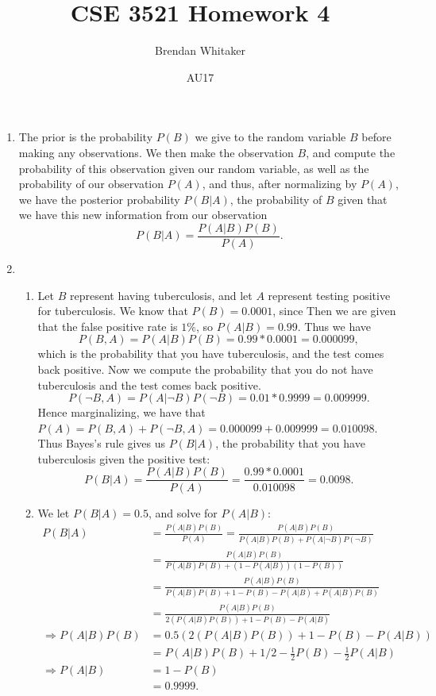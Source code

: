 \documentclass[10pt,oneside,reqno]{amsart}
\theoremstyle{plain}
\theoremstyle{definition}
\begin{document}
\title{CSE 3521 Homework 4}

\date{AU17}

\author[Brendan Whitaker]{Brendan Whitaker}

\maketitle

\begin{enumerate}[label=\arabic*.]

\item The prior is the probability $P(B)$ we give to the random variable $B$ before making any observations. We then make the observation $B$, and compute the probability of this observation given our random variable, as well as the probability of our observation $P(A)$, and thus, after normalizing by $P(A)$, we have the posterior probability $P(B|A)$, the probability of $B$ given that we have this new information from our observation
\[P(B|A) = \frac{P(A|B)P(B)}{P(A)}. \] 

\item 

\begin{enumerate}

\item Let $B$ represent having tuberculosis, and let $A$ represent testing positive for tuberculosis. We know that $P(B) = 0.0001$, since Then we are given that the false positive rate is $1\%$, so $P(A|B) = 0.99$. Thus we have
\[P(B,A) = P(A|B)P(B)= 0.99*0.0001 = 0.000099, \]
which is the probability that you have tuberculosis, and the test comes back positive. Now we compute the probability that you do not have tuberculosis and the test comes back positive. 
\[P(\neg B, A) = P(A|\neg B)P(\neg B) = 0.01 * 0.9999 = 0.009999. \]
Hence marginalizing, we have that $P(A) = P(B,A) + P(\neg B, A) = 0.000099 + 0.009999 = 0.010098$. 
Thus Bayes's rule gives us $P(B|A)$, the probability that you have tuberculosis given the positive test:
\[P(B|A) = \frac{P(A|B)P(B)}{P(A)} = \frac{0.99 * 0.0001}{0.010098} = 0.0098.\]


\item We let $P(B|A) = 0.5$, and solve for $P(A|B)$:
\begin{equation}
\begin{aligned}
P(B|A) &= \frac{P(A|B)P(B)}{P(A)} = \frac{P(A|B)P(B)}{P(A|B)P(B) + P(A|\neg B)P(\neg B)} \\
&= \frac{P(A|B)P(B)}{P(A|B)P(B) + (1 - P(A|B))(1 - P(B))}\\
&= \frac{P(A|B)P(B)}{P(A|B)P(B) + 1 - P(B) - P(A|B) + P(A|B)P(B)}\\
&= \frac{P(A|B)P(B)}{2(P(A|B)P(B)) + 1 - P(B) - P(A|B)}\\
\Rightarrow  P(A|B)P(B) &= 0.5(2(P(A|B)P(B)) + 1 - P(B) - P(A|B))\\
 &= P(A|B)P(B) + 1/2 - \frac{1}{2}P(B) - \frac{1}{2}P(A|B)\\
\Rightarrow P(A|B) &=  1 - P(B)\\
 &=  0.9999.\\
\end{aligned}
\end{equation}



\end{enumerate}
\end{enumerate}
\end{document}
